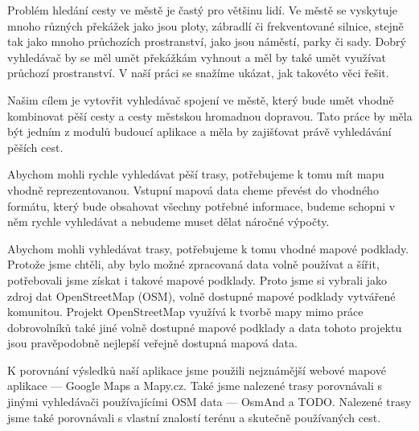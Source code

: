 
Problém hledání cesty ve městě je častý pro většinu lidí. Ve městě se vyskytuje
mnoho různých překážek jako jsou ploty, zábradlí či frekventované silnice,
stejně tak jako mnoho průchozích prostranství, jako jsou náměstí, parky či sady.
Dobrý vyhledávač by se měl umět překážkám vyhnout a měl by také umět využívat
průchozí prostranství. V naší práci se snažíme ukázat, jak takovéto věci řešit.

Našim cílem je vytovřit vyhledávač spojení ve městě, který bude umět vhodně
kombinovat pěší cesty a cesty městskou hromadnou dopravou. Tato práce by měla
být jedním z modulů budoucí aplikace a měla by zajišťovat právě vyhledávání
pěších cest.

Abychom mohli rychle vyhledávat pěší trasy, potřebujeme k tomu mít mapu vhodně
reprezentovanou. Vstupní mapová data cheme převést do vhodného formátu, který
bude obsahovat všechny potřebné informace, budeme schopni v něm rychle
vyhledávat a nebudeme muset dělat náročné výpočty. 

Abychom mohli vyhledávat trasy, potřebujeme k tomu vhodné mapové podklady.
Protože jsme chtěli, aby bylo možné zpracovaná data volně používat a šířit, 
potřebovali jsme získat i takové mapové podklady. Proto jsme si vybrali jako
zdroj dat OpenStreetMap (OSM), volně dostupné mapové podklady vytvářené komunitou. 
Projekt OpenStreetMap využívá k tvorbě mapy mimo práce dobrovolníků také jiné
volně dostupné mapové podklady a data tohoto projektu jsou pravěpodobně nejlepší
veřejně dostupná mapová data.

K porovnání výsledků naší aplikace jsme použili nejznámější webové mapové
aplikace --- Google Maps a Mapy.cz. Také jsme nalezené trasy porovnávali s jinými
vyhledávači používajícími OSM data --- OsmAnd a TODO. Nalezené trasy jsme také
porovnávali s vlastní znalostí terénu a skutečně používaných cest.

